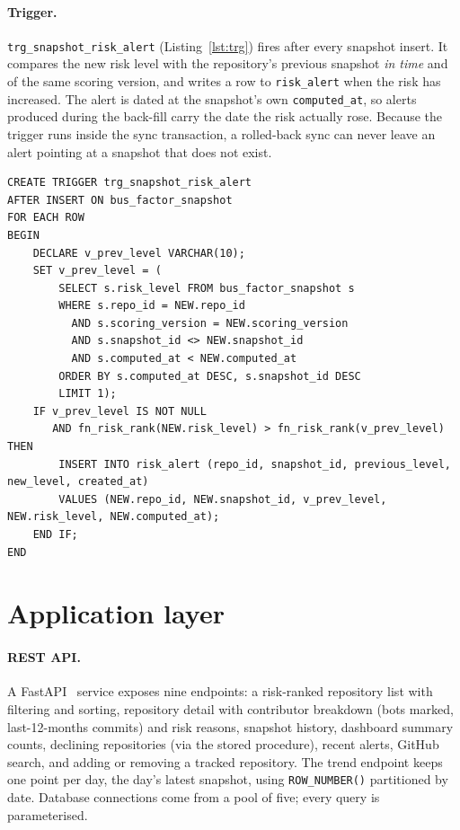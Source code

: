 \documentclass[11pt,a4paper]{report}
\begin{document}
\paragraph{Trigger.} \texttt{trg\_snapshot\_risk\_alert} (Listing~\ref{lst:trg})
fires after every snapshot insert. It compares the new risk level with the
repository's previous snapshot \emph{in time} and of the same scoring version,
and writes a row to \texttt{risk\_alert} when the risk has increased. The alert
is dated at the snapshot's own \texttt{computed\_at}, so alerts produced during
the back-fill carry the date the risk actually rose. Because the trigger runs
inside the sync transaction, a rolled-back sync can never leave an alert
pointing at a snapshot that does not exist.

\begin{lstlisting}[language=MySQL, caption={Trigger recording risk increases.}, label={lst:trg}]
CREATE TRIGGER trg_snapshot_risk_alert
AFTER INSERT ON bus_factor_snapshot
FOR EACH ROW
BEGIN
    DECLARE v_prev_level VARCHAR(10);
    SET v_prev_level = (
        SELECT s.risk_level FROM bus_factor_snapshot s
        WHERE s.repo_id = NEW.repo_id
          AND s.scoring_version = NEW.scoring_version
          AND s.snapshot_id <> NEW.snapshot_id
          AND s.computed_at < NEW.computed_at
        ORDER BY s.computed_at DESC, s.snapshot_id DESC
        LIMIT 1);
    IF v_prev_level IS NOT NULL
       AND fn_risk_rank(NEW.risk_level) > fn_risk_rank(v_prev_level) THEN
        INSERT INTO risk_alert (repo_id, snapshot_id, previous_level, new_level, created_at)
        VALUES (NEW.repo_id, NEW.snapshot_id, v_prev_level, NEW.risk_level, NEW.computed_at);
    END IF;
END
\end{lstlisting}

\section{Application layer}

\paragraph{REST API.} A FastAPI~\cite{fastapi} service exposes nine endpoints:
a risk-ranked repository list with filtering and sorting, repository detail
with contributor breakdown (bots marked, last-12-months commits) and risk
reasons, snapshot history, dashboard summary counts, declining repositories
(via the stored procedure), recent alerts, GitHub search, and adding or
removing a tracked repository. The trend endpoint keeps one point per day,
the day's latest snapshot, using \texttt{ROW\_NUMBER()} partitioned by date.
Database connections come from a pool of five; every query is parameterised.
\end{document}
